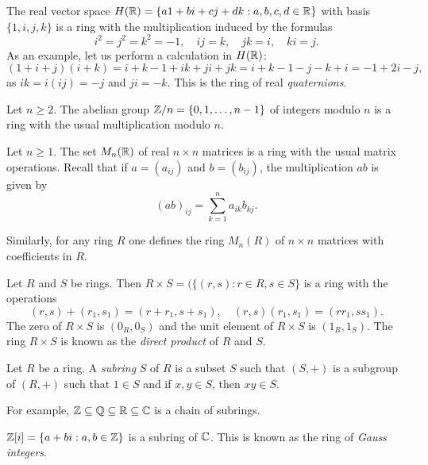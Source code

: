 \begin{example}
    The real vector space $H(\mathbb{R})=\{a1+bi+cj+dk:a,b,c,d\in\mathbb{R}\}$ with basis $\{1,i,j,k\}$ 
    is a ring with the multiplication induced by
    the formulas 
    \[
    i^2=j^2=k^2=-1,
    \quad ij=k,
    \quad jk=i,
    \quad ki=j.
    \]
    As an example, let us perform a calculation in $H(\mathbb{R})$: 
    \[
    (1+i+j)(i+k)=i+k-1+ik+ji+jk=i+k-1-j-k+i=-1+2i-j,
    \]
    as $ik=i(ij)=-j$ and $ji=-k$. This is the ring of real \emph{quaternions}.
\end{example}

\begin{example}
    Let $n\geq2$. 
    The abelian group $\mathbb{Z}/n=\{0,1,\dots,n-1\}$ of integers modulo $n$ is a ring 
    with the usual multiplication modulo $n$. 
\end{example}

\begin{example}
    Let $n\geq1$. 
    The set $M_n(\mathbb{R})$ of real $n\times n$ matrices is a ring with the usual matrix operations. Recall
    that if $a=(a_{ij})$ and $b=(b_{ij})$, the multiplication $ab$ is given by
    \[
    (ab)_{ij}=\sum_{k=1}^n a_{ik}b_{kj}.
    \]
\end{example}

Similarly, for any ring $R$ one defines the ring $M_n(R)$ of $n\times n$ matrices
with coefficients in $R$. 

\begin{example}
\label{exa:direct_rings}
    Let $R$ and $S$ be rings. Then 
    $R\times S=(\{(r,s):r\in R,s\in S\}$ 
    is a ring with the operations 
    \[
    (r,s)+(r_1,s_1)=(r+r_1,s+s_1),\quad 
    (r,s)(r_1,s_1)=(rr_1,ss_1).
    \]
    The zero of $R\times S$ is $(0_R,0_S)$ and 
    the unit element of $R\times S$ is $(1_R,1_S)$. The ring 
    $R\times S$ is known as the \emph{direct product} of $R$ and $S$. 
\end{example}

\begin{definition}
    Let $R$ be a ring. A \emph{subring} $S$ of $R$ is a subset $S$ such that
    $(S,+)$ is a subgroup of $(R,+)$ such that $1\in S$ and 
    if $x,y\in S$, then $xy\in S$. 
\end{definition}

For example, $\mathbb{Z}\subseteq\mathbb{Q}\subseteq\mathbb{R}\subseteq\mathbb{C}$ is a chain of subrings. 

\begin{example}
    $\mathbb{Z}[i]=\{a+bi:a,b\in\mathbb{Z}\}$ is a subring of $\mathbb{C}$. 
    This is known as the ring of \emph{Gauss integers}.  
\end{example}

